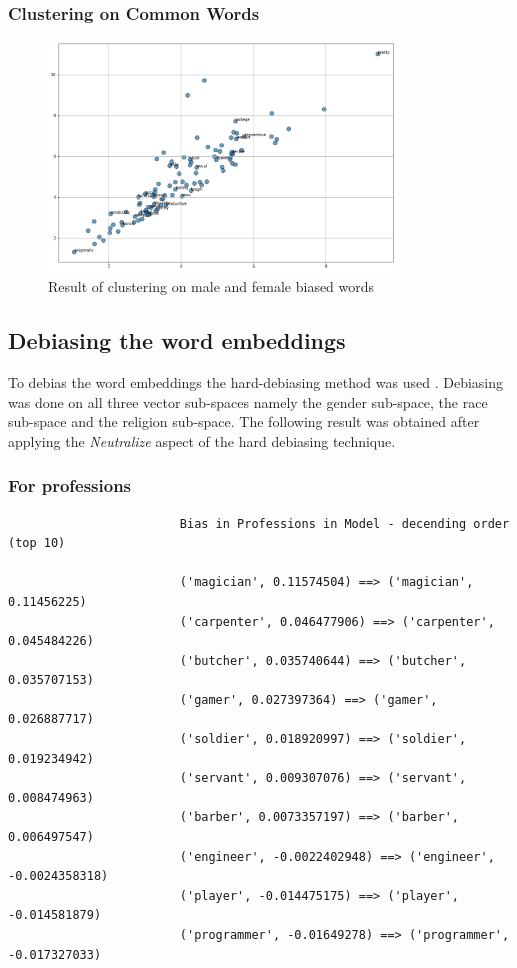 \documentclass[12pt, a4paper]{article}
\begin{document}
					\subsubsection{Clustering on Common Words}
				\begin{figure}[H]
					\centerline{\includegraphics[width=25em]{biased_misc.png}}
					\caption{Result of clustering on male and female biased words}
					\label{common-cluster-fig}
				\end{figure}
			
			\subsection{Debiasing the word embeddings}
				To debias the word embeddings the hard-debiasing method was used \cite{2}. Debiasing was done on all three vector sub-spaces namely the gender sub-space, the race sub-space and the religion sub-space. The following result was obtained after applying the \emph{Neutralize} aspect of the hard debiasing technique.
				
				\subsubsection{For professions}
					\begin{verbatim}
						Bias in Professions in Model - decending order (top 10)
						
						('magician', 0.11574504) ==> ('magician', 0.11456225)
						('carpenter', 0.046477906) ==> ('carpenter', 0.045484226)
						('butcher', 0.035740644) ==> ('butcher', 0.035707153)
						('gamer', 0.027397364) ==> ('gamer', 0.026887717)
						('soldier', 0.018920997) ==> ('soldier', 0.019234942)
						('servant', 0.009307076) ==> ('servant', 0.008474963)
						('barber', 0.0073357197) ==> ('barber', 0.006497547)
						('engineer', -0.0022402948) ==> ('engineer', -0.0024358318)
						('player', -0.014475175) ==> ('player', -0.014581879)
						('programmer', -0.01649278) ==> ('programmer', -0.017327033)
					\end{verbatim}
				
\end{document}
